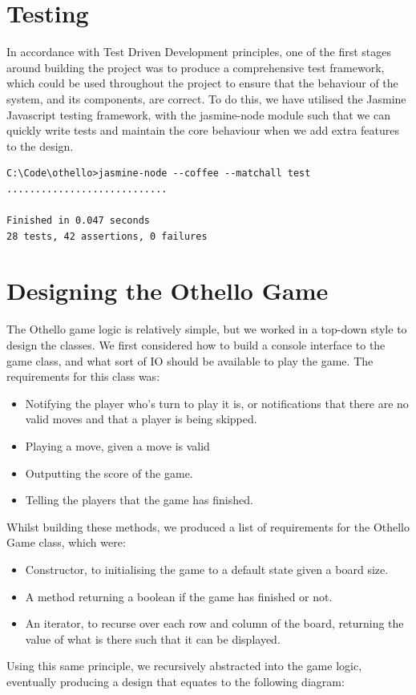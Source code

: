 \documentclass[a4wide, 11pt]{article}
\begin{document}
\section{Testing}
In accordance with Test Driven Development principles, one of the first stages around building the project was to produce a comprehensive test framework, which could be used throughout the project to ensure that the behaviour of the system, and its components, are correct. To do this, we have utilised the Jasmine Javascript testing framework, with the jasmine-node module such that we can quickly write tests and maintain the core behaviour when we add extra features to the design.

\begin{verbatim}
C:\Code\othello>jasmine-node --coffee --matchall test
............................

Finished in 0.047 seconds
28 tests, 42 assertions, 0 failures
\end{verbatim}

\section{Designing the Othello Game}

The Othello game logic is relatively simple, but we worked in a top-down style to design the classes. We first considered how to build a console interface to the game class, and what sort of IO should be available to play the game. The requirements for this class was:
\begin{itemize}
\item Notifying the player who's turn to play it is, or notifications that there are no valid moves and that a player is being skipped.
\item Playing a move, given a move is valid
\item Outputting the score of the game.
\item Telling the players that the game has finished.
\end{itemize}
Whilst building these methods, we produced a list of requirements for the Othello Game class, which were:
\begin{itemize}
\item Constructor, to initialising the game to a default state given a board size.
\item A method returning a boolean if the game has finished or not.
\item An iterator, to recurse over each row and column of the board, returning the value of what is there such that it can be displayed.
\end{itemize}
Using this same principle, we recursively abstracted into the game logic, eventually producing a design that equates to the following diagram:
\end{document}
